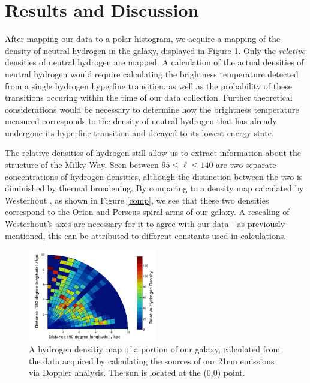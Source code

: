 \section{Results and Discussion}
After mapping our data to a polar histogram, we acquire a mapping of the density of neutral hydrogen in the galaxy, displayed in Figure \ref{result}. Only the \textit{relative} densities of neutral hydrogen are mapped. A calculation of the actual densities of neutral hydrogen would require calculating the brightness temperature detected from a single hydrogen hyperfine transition, as well as the probability of these transitions occuring within the time of our data collection. Further theoretical considerations would be necessary to determine how the brightness temperature measured corresponds to the density of neutral hydrogen that has already undergone its hyperfine transition and decayed to its lowest energy state.

The relative densities of hydrogen still allow us to extract information about the structure of the Milky Way. Seen between $95 \leq \ell \leq 140$ are two separate concentrations of hydrogen densities, although the distinction between the two is diminished by thermal broadening. By comparing to a density map calculated by Westerhout \cite{wester}, as shown in Figure \ref{comp}, we see that these two densities correspond to the Orion and Perseus spiral arms of our galaxy. A rescaling of Westerhout's axes are necessary for it to agree with our data - as previously mentioned, this can be attributed to different constants used in calculations.

\begin{figure}
  \includegraphics[width=0.5\textwidth]{final}
  \caption{A hydrogen densitiy map of a portion of our galaxy, calculated from the data acquired by calculating the sources of our 21cm emissions via Doppler analysis. The sun is located at the (0,0) point. }
  \label{result}
\end{figure}

